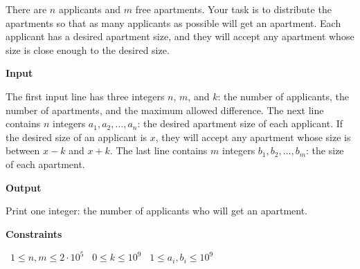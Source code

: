 There are $n$ applicants and $m$ free apartments. Your task is to distribute the apartments so that as many applicants as possible will get an apartment.
Each applicant has a desired apartment size, and they will accept any apartment whose size is close enough to the desired size.

\vspace{0.3cm}\noindent\textbf{Input}

The first input line has three integers $n$, $m$, and $k$: the number of applicants, the number of apartments, and the maximum allowed difference.
The next line contains $n$ integers $a_1, a_2, \ldots, a_n$: the desired apartment size of each applicant. If the desired size of an applicant is $x$, they will accept any apartment whose size is between $x-k$ and $x+k$.
The last line contains $m$ integers $b_1, b_2, \ldots, b_m$: the size of each apartment.

\vspace{0.3cm}\noindent\textbf{Output}

Print one integer: the number of applicants who will get an apartment.

\vspace{0.3cm}\noindent\textbf{Constraints}

\textbullet\ $1 \le n, m \le 2 \cdot 10^5$
\textbullet\ $0 \le k \le 10^9$
\textbullet\ $1 \le a_i, b_i \le 10^9$